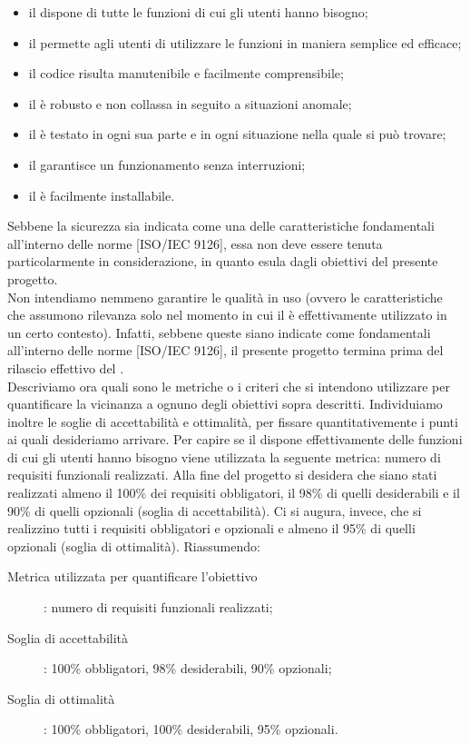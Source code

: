 				\begin{itemize}
					\item il  dispone di tutte le funzioni di cui gli utenti hanno bisogno;
					\item il  permette agli utenti di utilizzare le funzioni in maniera semplice ed efficace;
					\item il codice risulta manutenibile e facilmente comprensibile;
					\item il  è robusto e non collassa in seguito a situazioni anomale;
					\item il  è testato in ogni sua parte e in ogni situazione nella quale si può trovare;
					\item il  garantisce un funzionamento senza interruzioni;
					\item il  è facilmente installabile.
				\end{itemize}
				Sebbene la sicurezza sia indicata come una delle caratteristiche fondamentali all'interno delle norme [ISO/IEC 9126], essa non deve essere tenuta particolarmente in considerazione, in quanto esula dagli obiettivi del presente progetto.\\
				Non intendiamo nemmeno garantire le qualità in uso (ovvero le caratteristiche che assumono rilevanza solo nel momento in cui il  è effettivamente utilizzato in un certo contesto). Infatti, sebbene queste siano indicate come fondamentali all'interno delle norme [ISO/IEC 9126], il presente progetto termina prima del rilascio effettivo del .\\
				Descriviamo ora quali sono le metriche o i criteri che si intendono utilizzare per quantificare la vicinanza a ognuno degli obiettivi sopra descritti. Individuiamo inoltre le soglie di accettabilità e ottimalità, per fissare quantitativemente i punti ai quali desideriamo arrivare.
					Per capire se il  dispone effettivamente delle funzioni di cui gli utenti hanno bisogno viene utilizzata la seguente metrica: numero di requisiti funzionali realizzati. Alla fine del progetto si desidera che siano stati realizzati almeno il 100\% dei requisiti obbligatori, il 98\% di quelli desiderabili e il 90\% di quelli opzionali (soglia di accettabilità). Ci si augura, invece, che si realizzino tutti i requisiti obbligatori e opzionali e almeno il 95\% di quelli opzionali (soglia di ottimalità). Riassumendo:
					\begin{description}
						\item[Metrica utilizzata per quantificare l'obiettivo]: numero di requisiti funzionali realizzati;
						\item[Soglia di accettabilità]: 100\% obbligatori, 98\% desiderabili, 90\% opzionali;
						\item[Soglia di ottimalità]: 100\% obbligatori, 100\% desiderabili, 95\% opzionali.
					\end{description}
